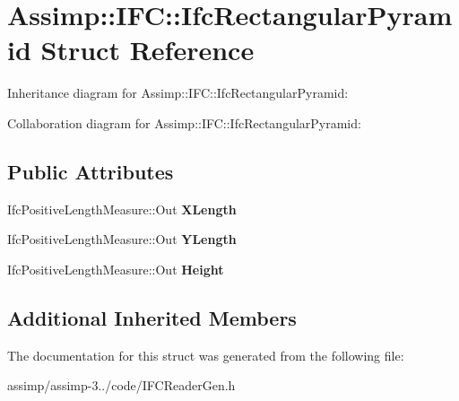 \hypertarget{struct_assimp_1_1_i_f_c_1_1_ifc_rectangular_pyramid}{\section{Assimp\+:\+:I\+F\+C\+:\+:Ifc\+Rectangular\+Pyramid Struct Reference}
\label{struct_assimp_1_1_i_f_c_1_1_ifc_rectangular_pyramid}
}


Inheritance diagram for Assimp\+:\+:I\+F\+C\+:\+:Ifc\+Rectangular\+Pyramid\+:


Collaboration diagram for Assimp\+:\+:I\+F\+C\+:\+:Ifc\+Rectangular\+Pyramid\+:
\subsection*{Public Attributes}
\begin{DoxyCompactItemize}
\item 
\hypertarget{struct_assimp_1_1_i_f_c_1_1_ifc_rectangular_pyramid_aa239f15cf283d9b86562b0a8f5213814}{Ifc\+Positive\+Length\+Measure\+::\+Out {\bfseries X\+Length}}\label{struct_assimp_1_1_i_f_c_1_1_ifc_rectangular_pyramid_aa239f15cf283d9b86562b0a8f5213814}

\item 
\hypertarget{struct_assimp_1_1_i_f_c_1_1_ifc_rectangular_pyramid_aa3612b79f81cd1bfe18f53846fea026d}{Ifc\+Positive\+Length\+Measure\+::\+Out {\bfseries Y\+Length}}\label{struct_assimp_1_1_i_f_c_1_1_ifc_rectangular_pyramid_aa3612b79f81cd1bfe18f53846fea026d}

\item 
\hypertarget{struct_assimp_1_1_i_f_c_1_1_ifc_rectangular_pyramid_abebfea77c759a210a3c8edaf7c47ebf6}{Ifc\+Positive\+Length\+Measure\+::\+Out {\bfseries Height}}\label{struct_assimp_1_1_i_f_c_1_1_ifc_rectangular_pyramid_abebfea77c759a210a3c8edaf7c47ebf6}

\end{DoxyCompactItemize}
\subsection*{Additional Inherited Members}


The documentation for this struct was generated from the following file\+:\begin{DoxyCompactItemize}
\item 
assimp/assimp-\/3../code/I\+F\+C\+Reader\+Gen.\+h\end{DoxyCompactItemize}
